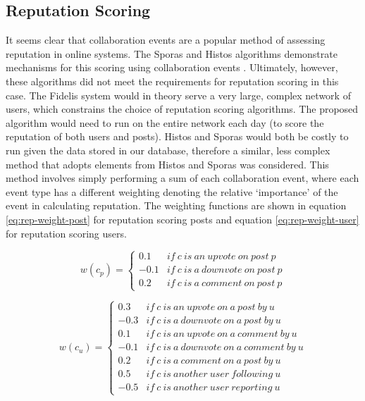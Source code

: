 \subsection{Reputation Scoring}
It seems clear that collaboration events are a popular method of assessing reputation in online systems. The Sporas and Histos algorithms demonstrate mechanisms for this scoring using collaboration events \cite{mcnally2013} \cite{zacharia2000}. Ultimately, however, these algorithms did not meet the requirements for reputation scoring in this case. The Fidelis system would in theory serve a very large, complex network of users, which constrains the choice of reputation scoring algorithms. The proposed algorithm would need to run on the entire network each day (to score the reputation of both users and posts). Histos and Sporas would both be costly to run given the data stored in our database, therefore a similar, less complex method that adopts elements from Histos and Sporas was considered. This method involves simply performing a sum of each collaboration event, where each event type has a different weighting denoting the relative `importance' of the event in calculating reputation. The weighting functions are shown in equation \ref{eq:rep-weight-post} for reputation scoring posts and equation \ref{eq:rep-weight-user} for reputation scoring users.

\begin{equation}
	\label{eq:rep-weight-post}
	 w(c_p) = \left\{\begin{matrix}
			0.1 & if\ c\ is\ an\ upvote\ on\ post\ p \\ 
			-0.1 & if\ c\ is\ a\ downvote\ on\ post\ p \\ 
			0.2 & if\ c\ is\ a\ comment\ on\ post\ p
	\end{matrix}\right.
\end{equation}

\begin{equation}
	\label{eq:rep-weight-user}
		w(c_u) = \left\{\begin{matrix}
			0.3 & if\ c\ is\ an\ upvote\ on\ a\ post\ by\ u\\ 
			-0.3 & if\ c\ is\ a\ downvote\ on\ a\ post\ by\ u \\ 
			0.1 & if\ c\ is\ an\ upvote\ on\ a\ comment\ by\ u \\ 
			-0.1 & if\ c\ is\ a\ downvote\ on\ a\ comment\ by\ u \\ 
			0.2 & if\ c\ is\ a\ comment\ on\ a\ post\ by\ u\\ 
			0.5 & if\ c\ is\ another\ user\ following\ u\\
			-0.5 & if\ c\ is\ another\ user\ reporting\ u
		\end{matrix}\right.
\end{equation}

